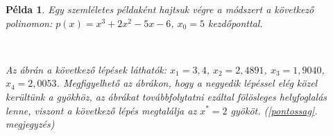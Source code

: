 \documentclass[a4paper,12pt]{report}
\newtheorem{Pl}[Tet]{Példa}
\begin{document}
            \begin{Pl}
				Egy szemléletes példaként hajtsuk végre a módszert a következő polinomon: $p(x)=x^3+2x^2-5x-6$, $x_0=5$ kezdőponttal.

				\begin{figure}[h]
					\centering
					\hspace{3mm} %
					\\
					\hspace{3mm} %
				\end{figure}

				Az ábrán a következő lépések láthatók: $x_1=3,\!4$, $x_2=2,\!4891$, $x_3=1,\!9040$, $x_4=2,\!0053$. Megfigyelhető az ábrákon, hogy a negyedik lépéssel elég közel kerültünk a gyökhöz, az ábrákat továbbfolytatni ezáltal fölösleges helyfoglalás lenne, viszont a következő lépés megtalálja az $x^*=2$ gyököt. (\ref{pontossag}. megjegyzés)
			\end{Pl}
\end{document}
